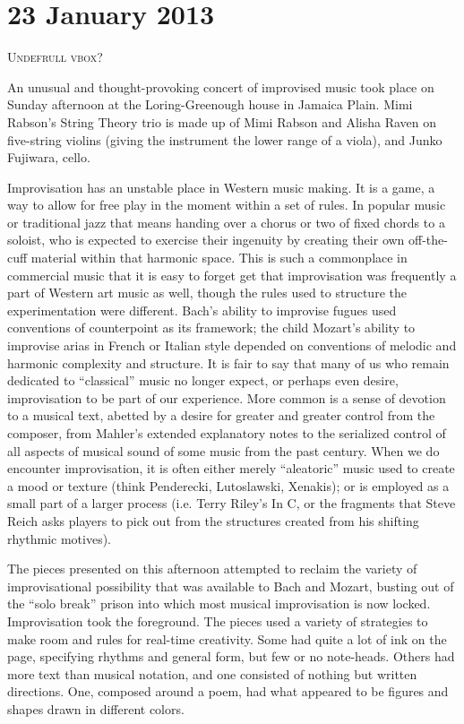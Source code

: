 \chapter{23 January 2013}

\textsc{Undefrull vbox?}

An unusual and thought-provoking concert of improvised music took place on Sunday afternoon at the Loring-Greenough house in Jamaica Plain. Mimi Rabson’s String Theory trio is made up of Mimi Rabson and Alisha Raven on five-string violins (giving the instrument the lower range of a viola), and Junko Fujiwara, cello.

Improvisation has an unstable place in Western music making. It is a game, a way to allow for free play in the moment within a set of rules. In popular music or traditional jazz that means handing over a chorus or two of fixed chords to a soloist, who is expected to exercise their ingenuity by creating their own off-the-cuff material within that harmonic space. This is such a commonplace in commercial music that it is easy to forget get that improvisation was frequently a part of Western art music as well, though the rules used to structure the experimentation were different. Bach’s ability to improvise fugues used conventions of counterpoint as its framework; the child Mozart’s ability to improvise arias in French or Italian style depended on conventions of melodic and harmonic complexity and structure. It is fair to say that many of us who remain dedicated to “classical” music no longer expect, or perhaps even desire, improvisation to be part of our experience. More common is a sense of devotion to a musical text, abetted by a desire for greater and greater control from the composer, from Mahler’s extended explanatory notes to the serialized control of all aspects of musical sound of some music from the past century. When we do encounter improvisation, it is often either merely “aleatoric” music used to create a mood or texture (think Penderecki, Lutoslawski, Xenakis); or is employed as a small part of a larger process (i.e. Terry Riley’s In C, or the fragments that Steve Reich asks players to pick out from the structures created from his shifting rhythmic motives).

The pieces presented on this afternoon attempted to reclaim the variety of improvisational possibility that was available to Bach and Mozart, busting out of the “solo break” prison into which most musical improvisation is now locked. Improvisation took the foreground. The pieces used a variety of strategies to make room and rules for real-time creativity. Some had quite a lot of ink on the page, specifying rhythms and general form, but few or no note-heads. Others had more text than musical notation, and one consisted of nothing but written directions. One, composed around a poem, had what appeared to be figures and shapes drawn in different colors.

